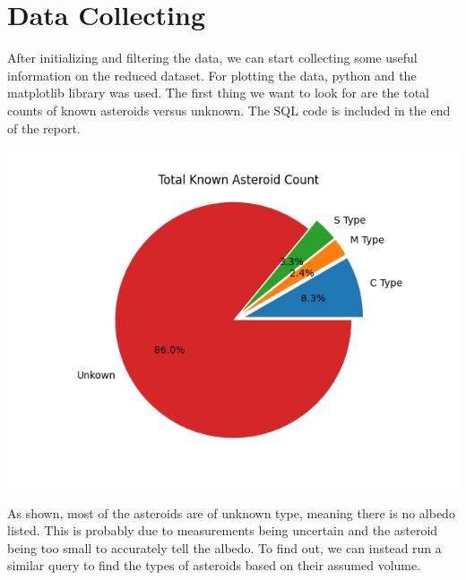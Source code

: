 \documentclass[12pt]{report}
\begin{document}

\newpage
\section*{Data Collecting}
\;\;\;\; After initializing and filtering the data, we can start collecting some useful information on the reduced dataset. For plotting the data, python and the matplotlib library was used. The first thing we want to look for are the total counts of known asteroids versus unknown. The SQL code is included in the end of the report.

\begin{center}
\includegraphics[scale=0.6]{"charts/total_counts.png"}
\end{center}

As shown, most of the asteroids are of unknown type, meaning there is no albedo listed. This is probably due to measurements being uncertain and the asteroid being too small to accurately tell the albedo. To find out, we can instead run a similar query to find the types of asteroids based on their assumed volume.
\end{document}
